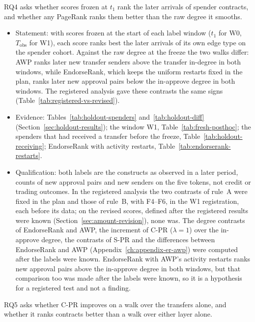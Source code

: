 
RQ4 asks whether scores frozen at $t_1$ rank the later arrivals of spender contracts, and whether any PageRank ranks them better than the raw degree it smooths.

\begin{itemize}
\item Statement: with scores frozen at the start of each label window ($t_1$ for W0, $T_{\mathrm{obs}}$ for W1), each score ranks best the later arrivals of its own edge type on the spender cohort. Against the raw degree at the freeze the two walks differ: AWP ranks later new transfer senders above the transfer in-degree in both windows, while EndorseRank, which keeps the uniform restarts fixed in the plan, ranks later new approval pairs below the in-approve degree in both windows. The registered analysis gave these contrasts the same signs (Table~\ref{tab:registered-vs-revised}).
\item Evidence: Tables~\ref{tab:holdout-spenders} and~\ref{tab:holdout-diff} (Section~\ref{sec:holdout-results}); the window W1, Table~\ref{tab:fresh-posthoc}; the spenders that had received a transfer before the freeze, Table~\ref{tab:holdout-receiving}; EndorseRank with activity restarts, Table~\ref{tab:endorserank-restarts}.
\item Qualification: both labels are the constructs as observed in a later period, counts of new approval pairs and new senders on the five tokens, not credit or trading outcomes. In the registered analysis the two contrasts of rule~A were fixed in the plan and those of rule~B, with F4--F6, in the W1 registration, each before its data; on the revised scores, defined after the registered results were known (Section~\ref{sec:amount-revision}), none was. The degree contrasts of EndorseRank and AWP, the increment of C-PR ($\lambda=1$) over the in-approve degree, the contrasts of S-PR and the differences between EndorseRank and AWP (Appendix~\ref{ch:appendix-er-awp}) were computed after the labels were known. EndorseRank with AWP's activity restarts ranks new approval pairs above the in-approve degree in both windows, but that comparison too was made after the labels were known, so it is a hypothesis for a registered test and not a finding.
\end{itemize}


RQ5 asks whether C-PR improves on a walk over the transfers alone, and whether it ranks contracts better than a walk over either layer alone.

